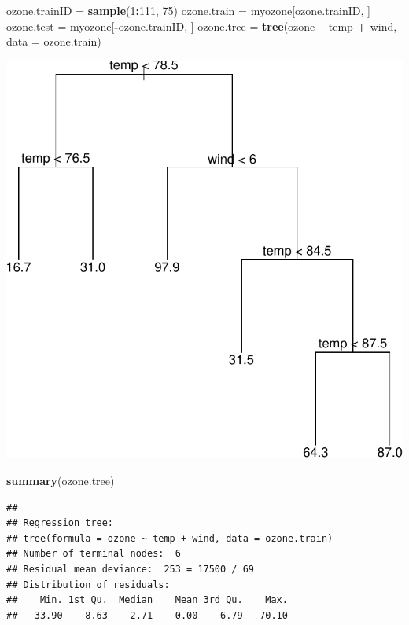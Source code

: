 \documentclass[ignorenonframetext,]{beamer}
\newenvironment{Shaded}{\begin{snugshade}}{\end{snugshade}}
\newcommand{\KeywordTok}[1]{\textcolor[rgb]{0.13,0.29,0.53}{\textbf{#1}}}
\newcommand{\DataTypeTok}[1]{\textcolor[rgb]{0.13,0.29,0.53}{#1}}
\newcommand{\DecValTok}[1]{\textcolor[rgb]{0.00,0.00,0.81}{#1}}
\newcommand{\StringTok}[1]{\textcolor[rgb]{0.31,0.60,0.02}{#1}}
\newcommand{\OperatorTok}[1]{\textcolor[rgb]{0.81,0.36,0.00}{\textbf{#1}}}
\newcommand{\NormalTok}[1]{#1}
\begin{document}
\begin{frame}[fragile]

\footnotesize

\begin{Shaded}
\begin{Highlighting}[]
\NormalTok{ozone.trainID =}\StringTok{ }\KeywordTok{sample}\NormalTok{(}\DecValTok{1}\OperatorTok{:}\DecValTok{111}\NormalTok{, }\DecValTok{75}\NormalTok{)}
\NormalTok{ozone.train =}\StringTok{ }\NormalTok{myozone[ozone.trainID, ]}
\NormalTok{ozone.test =}\StringTok{ }\NormalTok{myozone[}\OperatorTok{-}\NormalTok{ozone.trainID, ]}
\NormalTok{ozone.tree =}\StringTok{ }\KeywordTok{tree}\NormalTok{(ozone }\OperatorTok{~}\StringTok{ }\NormalTok{temp }\OperatorTok{+}\StringTok{ }\NormalTok{wind, }\DataTypeTok{data =}\NormalTok{ ozone.train)}
\end{Highlighting}
\end{Shaded}

\includegraphics{8TreesBEAMER_files/figure-beamer/unnamed-chunk-6-1.pdf}

\begin{Shaded}
\begin{Highlighting}[]
\KeywordTok{summary}\NormalTok{(ozone.tree)}
\end{Highlighting}
\end{Shaded}

\begin{verbatim}
## 
## Regression tree:
## tree(formula = ozone ~ temp + wind, data = ozone.train)
## Number of terminal nodes:  6 
## Residual mean deviance:  253 = 17500 / 69 
## Distribution of residuals:
##    Min. 1st Qu.  Median    Mean 3rd Qu.    Max. 
##  -33.90   -8.63   -2.71    0.00    6.79   70.10
\end{verbatim}

\normalsize

\end{frame}
\end{document}
